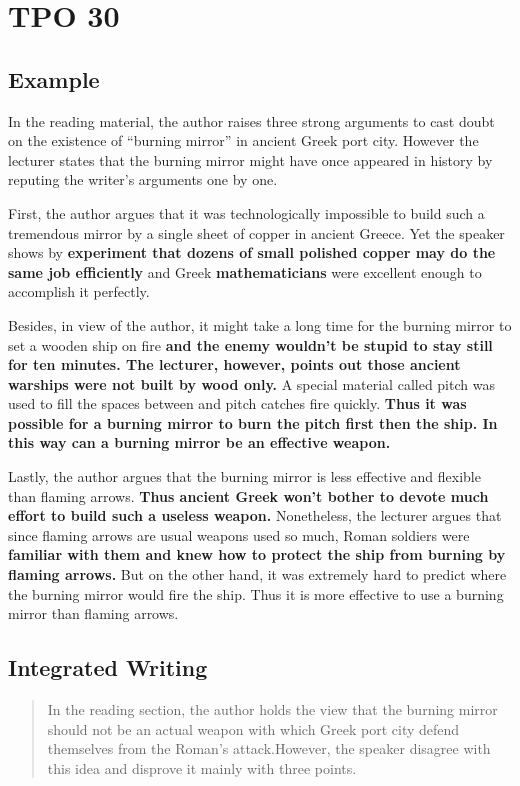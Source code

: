 \section{TPO 30}

\subsection{Example}

In the reading material, the author raises three strong arguments to cast doubt on the existence of “burning mirror” in ancient Greek port city. However the lecturer states that the burning mirror might have once appeared in history by reputing the writer’s arguments one by one.

First, the author argues that it was technologically impossible to build such a tremendous mirror by a single sheet of copper in ancient Greece. Yet the speaker shows by \textbf{experiment that dozens of small polished copper may do the same job efficiently} and Greek \textbf{mathematicians} were excellent enough to accomplish it perfectly.

Besides, in view of the author, it might take a long time for the burning mirror to set a wooden ship on fire \textbf{and the enemy wouldn’t be stupid to stay still for ten minutes. The lecturer, however, points out those ancient warships were not built by wood only.} A special material called pitch was used to fill the spaces between and pitch catches fire quickly. \textbf{Thus it was possible for a burning mirror to burn the pitch first then the ship. In this way can a burning mirror be an effective weapon.}

Lastly, the author argues that the burning mirror is less effective and flexible than flaming arrows. \textbf{Thus ancient Greek won’t bother to devote much effort to build such a useless weapon. }Nonetheless, the lecturer argues that since flaming arrows are usual weapons used so much, Roman soldiers were \textbf{familiar with them and knew how to protect the ship from burning by flaming arrows.} But on the other hand, it was extremely hard to predict where the burning mirror would fire the ship. Thus it is more effective to use a burning mirror than flaming arrows.

\subsection{Integrated Writing}

\begin{quote}
    In the reading section, the author holds the view that the burning mirror should not be an actual weapon with which Greek port city defend themselves from the Roman's attack.However, the speaker disagree with this idea and disprove it mainly with three points.
\end{quote}

